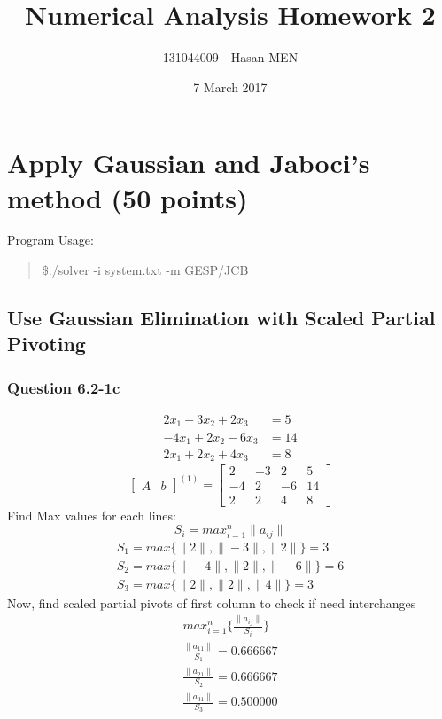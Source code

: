 \documentclass{article}
\title{Numerical Analysis Homework 2}
\author{131044009 - Hasan MEN}
\date{7 March 2017}
\begin{document}
\maketitle

\section{Apply Gaussian and Jaboci's method (50 points)}
Program Usage: 
\begin{quote}
	\$./solver -i system.txt -m {GESP/JCB}
\end{quote}


\subsection{Use Gaussian Elimination with Scaled Partial Pivoting}
\subsubsection{Question 6.2-1c}
\begin{align}
\label{q6.2.1.c.1}2x_{1}-3x_{2}+2x_{3}&=5 \\
\label{q6.2.1.c.2}-4x_{1}+2x_{2}-6x_{3}&=14 \\
\label{q6.2.1.c.3}2x_{1}+2x_{2}+4x_{3}&=8
\end{align}
\[
\left[
\begin{array}{c|c}
A&b
\end{array}
\right]^{(1)}
=
\left[
\begin{array}{ccc|c}
	2&-3&2&5\\
	-4&2&-6&14\\
	2&2&4&8 
\end{array}
\right]
\]
Find Max values for each lines: 
\begin{equation}
\label{findSMax1}S_{i}=max_{i=1}^n\|a_{ij}\|
\end{equation}
\begin{align}
	S_{1}=max\{\|2\|,\|-3\|,\|2\|\}=3\\
	S_{2}=max\{\|-4\|,\|2\|,\|-6\|\}=6\\
	S_{3}=max\{\|2\|,\|2\|,\|4\|\}=3
\end{align}
Now, find scaled partial pivots of first column to check if need interchanges
\begin{align}
	max_{i=1}^n\{\frac{\|a_{ij}\|}{S_{i}}\}\\
	\frac{\|a_{11}\|}{S_{1}}=0.666667\\
	\frac{\|a_{21}\|}{S_{2}}=0.666667\\
	\frac{\|a_{31}\|}{S_{3}}=0.500000
\end{align}
\end{document}
